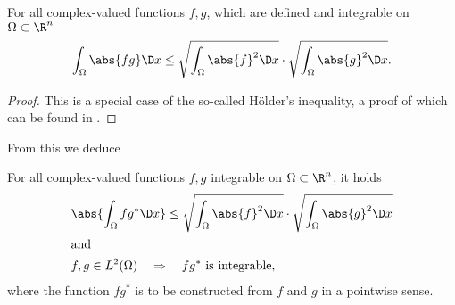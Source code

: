 \begin{lem}
	\label{aLittleHoelder}
	For all complex-valued functions $f,g$, which are defined and integrable on $\Omega \subset \R^n$
	\[ \int_\Omega \abs{ f g } \D x \le \sqrt {\int_\Omega \abs{f}^2 \D x} \cdot \sqrt{\int_\Omega \abs{g}^2 \D x}. \]
\end{lem}
\begin{proof}
	This is a special case of the so-called Hölder's inequality, a proof of which can be found in \cite{Adams2003}.
\end{proof}
\noindent
From this we deduce
\begin{lem}
	\label{WellDefL2InnProd}
	For all complex-valued functions $f,g$ integrable on $\Omega \subset \R^n$, it holds
	\begin{align*}
		&\abs{ \int_\Omega f g^\ast \D x } \le \sqrt{ \int_\Omega \abs{f}^2 \D x} \cdot \sqrt{\int_\Omega \abs{g}^2 \D x} \\
		\intertext{and}
		&f,g \in L^2(\Omega) \quad \Rightarrow \quad \text{$f g^\ast$ is integrable},
	\end{align*}
	where the function $f g^\ast$ is to be constructed from $f$ and $g$ in a pointwise sense.
\end{lem}

